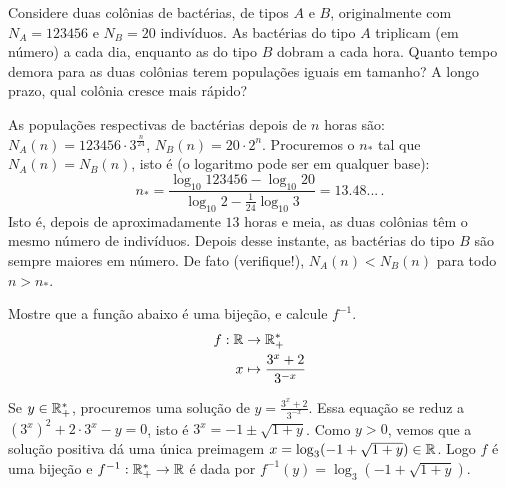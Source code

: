 \begin{exo} Considere duas colônias de bactérias, de tipos $A$ e $B$,
originalmente com $N_A=123456$ e $N_B=20$ indivíduos.
As bactérias do tipo $A$ triplicam (em número) a cada dia, enquanto as do tipo
$B$ dobram a cada hora.
Quanto tempo demora para as duas colônias terem populações iguais em tamanho?
A longo prazo, qual colônia cresce mais rápido?
\begin{sol}
As populações respectivas de bactérias depois de $n$ horas são:
$N_A(n)=123456\cdot 3^{\tfrac{n}{24}}$, $N_B(n)=20\cdot 2^n$.
Procuremos o $n_*$ tal que $N_A(n)=N_B(n)$, isto é (o logaritmo pode ser em
qualquer base):
$$n_*=\frac{\log_{10}123456-\log_{10}
20}{\log_{10}2-\tfrac{1}{24}\log_{10}3}=13.48...\,.$$
Isto é, depois de aproximadamente $13$ horas e meia, as duas colônias têm o
mesmo número de indivíduos.
Depois desse instante, as bactérias do tipo $B$ são sempre maiores em número.
De fato (verifique!), $N_A(n)<N_B(n)$ para todo $n>n_*$.
\end{sol}
\end{exo}

\begin{exo}
Mostre que a função abaixo é uma bijeção, e calcule $f^{-1}$.
\begin{align*}
 f:\mathbb{R}&\to \mathbb{R}_+^*\\
x&\mapsto \frac{3^x+2}{3^{-x}}
\end{align*}
\begin{sol}
Se $y\in \mathbb{R}_+^*$, procuremos uma solução de  
$y=\frac{3^x+2}{3^{-x}}$. Essa equação se reduz a $(3^x)^2+2\cdot 3^x-y=0$, isto
é $3^x=-1\pm \sqrt{1+y}$. Como $y>0$, vemos que a solução positiva dá uma única 
preimagem $x=\log_3(-1+\sqrt{1+y})\in \mathbb{R}$. Logo $f$ é uma bijeção e 
$f^{-1}:\mathbb{R}_+^*\to \mathbb{R}$ é dada por $f^{-1}(y)=\log_3(-1+\sqrt{1+y})$.
\end{sol}
\end{exo}

